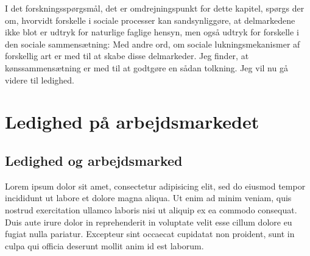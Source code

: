 I det forskningsspørgsmål, det er omdrejningspunkt for dette kapitel, spørgs der om, hvorvidt forskelle i sociale processer kan sandsynliggøre, at delmarkedene ikke blot er udtryk for naturlige faglige hensyn, men også udtryk for forskelle i den sociale sammensætning: Med andre ord, om sociale lukningsmekanismer af forskellig art er med til at skabe disse delmarkeder. Jeg finder, at kønssammensætning er med til at godtgøre en sådan tolkning. Jeg vil nu gå videre til ledighed. 




\section{Ledighed på arbejdsmarkedet \label{sec_delanalyse2 ledighed generelt}}






%
\subsection{Ledighed og arbejdsmarked}
%


Lorem ipsum dolor sit amet, consectetur adipisicing elit, sed do eiusmod
tempor incididunt ut labore et dolore magna aliqua. Ut enim ad minim veniam,
quis nostrud exercitation ullamco laboris nisi ut aliquip ex ea commodo
consequat. Duis aute irure dolor in reprehenderit in voluptate velit esse
cillum dolore eu fugiat nulla pariatur. Excepteur sint occaecat cupidatat non
proident, sunt in culpa qui officia deserunt mollit anim id est laborum.




